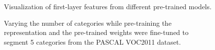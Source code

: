 \begin{figure}[t]
\centering
\fbox{\rule{0pt}{2in} \rule{0.9\linewidth}{0pt}}
\caption{Visualization of first-layer features from different pre-trained models.}
\label{fig:features}
\end{figure}

\begin{figure}[t]
\centering
\fbox{\rule{0pt}{2in} \rule{0.9\linewidth}{0pt}}
\caption{Varying the number of categories while pre-training the representation and the pre-trained weights were fine-tuned to segment 5 categories from the PASCAL VOC2011 dataset.}
\label{fig:categories}
\end{figure}
